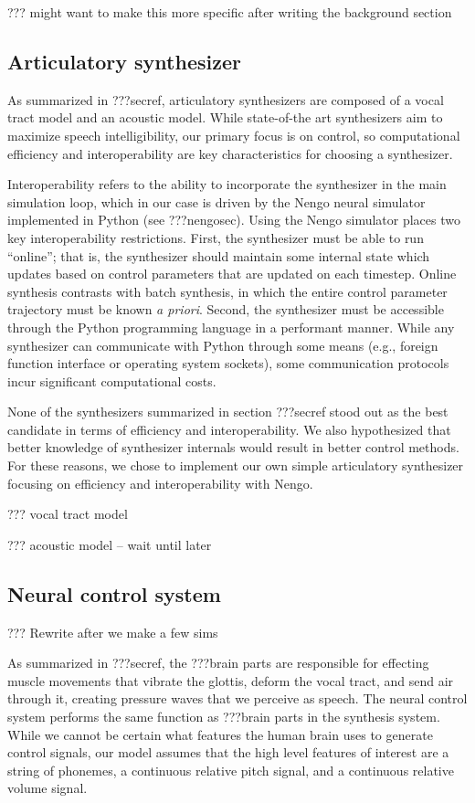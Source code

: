 ??? might want to make this more specific after writing
the background section

\subsection{Articulatory synthesizer}

As summarized in ???secref,
articulatory synthesizers are composed
of a vocal tract model and an acoustic model.
While state-of-the art synthesizers aim to
maximize speech intelligibility,
our primary focus is on control,
so computational efficiency
and interoperability are
key characteristics for choosing a synthesizer.

Interoperability refers to the ability
to incorporate the synthesizer
in the main simulation loop,
which in our case is driven by
the Nengo neural simulator
implemented in Python
(see ???nengosec).
Using the Nengo simulator places
two key interoperability restrictions.
First, the synthesizer must
be able to run ``online'';
that is, the synthesizer should maintain
some internal state which updates
based on control parameters
that are updated on each timestep.
Online synthesis contrasts with
batch synthesis, in which
the entire control parameter trajectory
must be known \textit{a priori}.
Second, the synthesizer must
be accessible through the Python
programming language in a performant manner.
While any synthesizer can communicate
with Python through some means
(e.g., foreign function interface
or operating system sockets),
some communication protocols incur
significant computational costs.

None of the synthesizers summarized in
section ???secref
stood out as the best candidate
in terms of efficiency and interoperability.
We also hypothesized that better knowledge
of synthesizer internals would
result in better control methods.
For these reasons,
we chose to implement our own
simple articulatory synthesizer focusing on
efficiency and interoperability with Nengo.

??? vocal tract model

??? acoustic model -- wait until later

\subsection{Neural control system}

??? Rewrite after we make a few sims

As summarized in ???secref,
the ???brain parts
are responsible for effecting
muscle movements that
vibrate the glottis,
deform the vocal tract,
and send air through it,
creating pressure waves
that we perceive as speech.
The neural control system
performs the same function as ???brain parts
in the synthesis system.
While we cannot be certain
what features the human brain
uses to generate control signals,
our model assumes that the
high level features of interest
are a string of phonemes,
a continuous relative pitch signal,
and a continuous relative volume signal.

